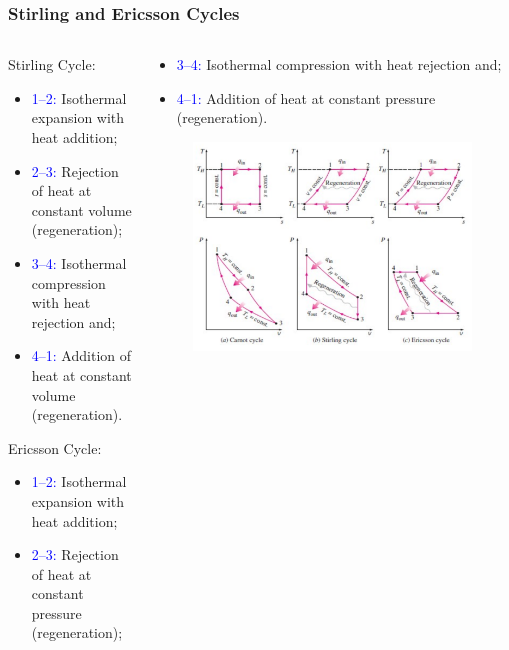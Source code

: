 \documentclass[10pt,compress]{beamer}
\begin{document}
\begin{frame}
 \frametitle{Stirling and Ericsson Cycles}
  \begin{columns}
   \begin{column}[c]{0.5\linewidth}
    Stirling Cycle:
    \begin{itemize}
     \item <1-> \textcolor{blue}{1--2:} Isothermal expansion with heat addition;
     \item <2-> \textcolor{blue}{2--3:} Rejection of heat at constant volume (regeneration);
     \item <3-> \textcolor{blue}{3--4:} Isothermal compression with heat rejection and;
     \item <4-> \textcolor{blue}{4--1:} Addition of heat at constant volume (regeneration).
    \end{itemize}

    Ericsson Cycle:
    \begin{itemize}
     \item <5-> \textcolor{blue}{1--2:} Isothermal expansion with heat addition;
     \item <6-> \textcolor{blue}{2--3:} Rejection of heat at constant pressure  (regeneration);
    \end{itemize}

   \end{column}
   \begin{column}[c]{0.5\linewidth}
    \begin{itemize}
     \item <7-> \textcolor{blue}{3--4:} Isothermal compression with heat rejection and;
     \item <8-> \textcolor{blue}{4--1:} Addition of heat at constant pressure (regeneration).
    \end{itemize}
    \begin{figure}%
     \begin{center}
      \includegraphics[width=6.cm,clip]{./Pics/InternalCombustion_StirlingEricssonCarnot}
     \end{center}
    \end{figure}   
   \end{column}  
  \end{columns}
\end{frame}
\end{document}
